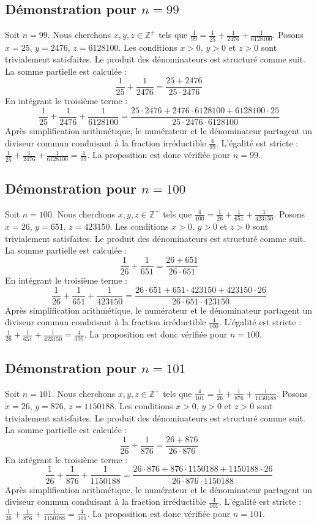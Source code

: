 \documentclass[11pt,a4paper]{article}
\begin{document}
\subsection{Démonstration pour $n = 99$}
Soit $n = 99$. Nous cherchons $x, y, z \in \mathbb{Z}^{+}$ tels que $\frac{4}{99} = \frac{1}{25} + \frac{1}{2476} + \frac{1}{6128100}$.
Posons $x = 25$, $y = 2476$, $z = 6128100$.
Les conditions $x > 0$, $y > 0$ et $z > 0$ sont trivialement satisfaites.
Le produit des dénominateurs est structuré comme suit. La somme partielle est calculée :
$$ \frac{1}{25} + \frac{1}{2476} = \frac{25+2476}{25 \cdot 2476} $$
En intégrant le troisième terme :
$$ \frac{1}{25} + \frac{1}{2476} + \frac{1}{6128100} = \frac{25 \cdot 2476 + 2476 \cdot 6128100 + 6128100 \cdot 25}{25 \cdot 2476 \cdot 6128100} $$
Après simplification arithmétique, le numérateur et le dénominateur partagent un diviseur commun conduisant à la fraction irréductible $\frac{4}{99}$.
L'égalité est stricte : $\frac{1}{25} + \frac{1}{2476} + \frac{1}{6128100} = \frac{4}{99}$.
La proposition est donc vérifiée pour $n = 99$.
\subsection{Démonstration pour $n = 100$}
Soit $n = 100$. Nous cherchons $x, y, z \in \mathbb{Z}^{+}$ tels que $\frac{4}{100} = \frac{1}{26} + \frac{1}{651} + \frac{1}{423150}$.
Posons $x = 26$, $y = 651$, $z = 423150$.
Les conditions $x > 0$, $y > 0$ et $z > 0$ sont trivialement satisfaites.
Le produit des dénominateurs est structuré comme suit. La somme partielle est calculée :
$$ \frac{1}{26} + \frac{1}{651} = \frac{26+651}{26 \cdot 651} $$
En intégrant le troisième terme :
$$ \frac{1}{26} + \frac{1}{651} + \frac{1}{423150} = \frac{26 \cdot 651 + 651 \cdot 423150 + 423150 \cdot 26}{26 \cdot 651 \cdot 423150} $$
Après simplification arithmétique, le numérateur et le dénominateur partagent un diviseur commun conduisant à la fraction irréductible $\frac{4}{100}$.
L'égalité est stricte : $\frac{1}{26} + \frac{1}{651} + \frac{1}{423150} = \frac{4}{100}$.
La proposition est donc vérifiée pour $n = 100$.
\subsection{Démonstration pour $n = 101$}
Soit $n = 101$. Nous cherchons $x, y, z \in \mathbb{Z}^{+}$ tels que $\frac{4}{101} = \frac{1}{26} + \frac{1}{876} + \frac{1}{1150188}$.
Posons $x = 26$, $y = 876$, $z = 1150188$.
Les conditions $x > 0$, $y > 0$ et $z > 0$ sont trivialement satisfaites.
Le produit des dénominateurs est structuré comme suit. La somme partielle est calculée :
$$ \frac{1}{26} + \frac{1}{876} = \frac{26+876}{26 \cdot 876} $$
En intégrant le troisième terme :
$$ \frac{1}{26} + \frac{1}{876} + \frac{1}{1150188} = \frac{26 \cdot 876 + 876 \cdot 1150188 + 1150188 \cdot 26}{26 \cdot 876 \cdot 1150188} $$
Après simplification arithmétique, le numérateur et le dénominateur partagent un diviseur commun conduisant à la fraction irréductible $\frac{4}{101}$.
L'égalité est stricte : $\frac{1}{26} + \frac{1}{876} + \frac{1}{1150188} = \frac{4}{101}$.
La proposition est donc vérifiée pour $n = 101$.
\end{document}

